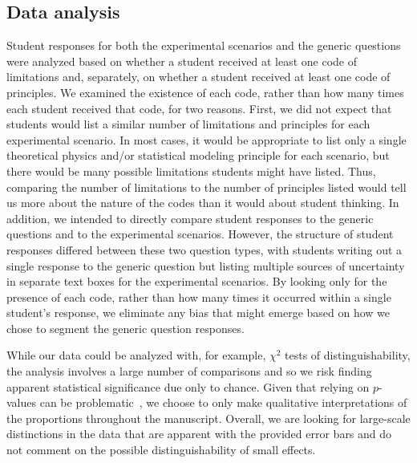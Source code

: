 \documentclass[english,aps,prstper,reprint,showpacs,longbibliography,superscriptaddress,nofootinbib]{revtex4-2}
\begin{document}
\subsection{Data analysis}

Student responses for both the experimental scenarios and the generic questions were analyzed based on whether a student received at least one code of limitations and, separately, on whether a student received at least one code of principles. We examined the existence of each code, rather than how many times each student received that code, for two reasons. First, we did not expect that students would list a similar number of limitations and principles for each experimental scenario. In most cases, it would be appropriate to list only a single theoretical physics and/or statistical modeling principle for each scenario, but there would be many possible limitations students might have listed. Thus, comparing the number of limitations to the number of principles listed would tell us more about the nature of the codes than it would about student thinking. In addition, we intended to directly compare student responses to the generic questions and to the experimental scenarios. However, the structure of student responses differed between these two question types, with students writing out a single response to the generic question but listing multiple sources of uncertainty in separate text boxes for the experimental scenarios. By looking only for the presence of each code, rather than how many times it occurred within a single student's response, we eliminate any bias that might emerge based on how we chose to segment the generic question responses.


While our data could be analyzed with, for example, $\chi^2$ tests of distinguishability, the analysis involves a large number of comparisons and so we risk finding apparent statistical significance due only to chance. Given that relying on $p$-values can be problematic~\cite[see, for example, ][]{cohen_earth_1994, cumming_new_2013, nosek_preregistration_2018}, we choose to only make qualitative interpretations of the proportions throughout the manuscript. Overall, we are looking for large-scale distinctions in the data that are apparent with the provided error bars and do not comment on the possible distinguishability of small effects.
\end{document}
